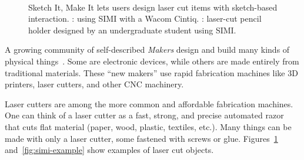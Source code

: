 \documentclass{article}
\begin{document}
\begin{figure}[h]
\centering 
{}
\\
\caption{Sketch It, Make It lets users design laser cut items with
  sketch-based interaction. : using SIMI with a
  Wacom Cintiq. : laser-cut pencil
  holder designed by an undergraduate student using SIMI.}
\label{fig:simi-intro}
\end{figure}

A growing community of self-described \textit{Makers} design and build
many kinds of physical things~\cite{atlantic-rapid-fab}. Some are
electronic devices, while others are made entirely from traditional
materials. These ``new makers'' use rapid fabrication machines like 3D
printers, laser cutters, and other CNC machinery.

Laser cutters are among the more common and affordable fabrication
machines. One can think of a laser cutter as a fast, strong, and
precise automated razor that cuts flat material (paper, wood, plastic,
textiles, etc.). Many things can be made with only a laser cutter,
some fastened with screws or glue. Figures~\ref{fig:simi-intro}
and~\ref{fig:simi-example} show examples of laser cut objects.
\end{document}
